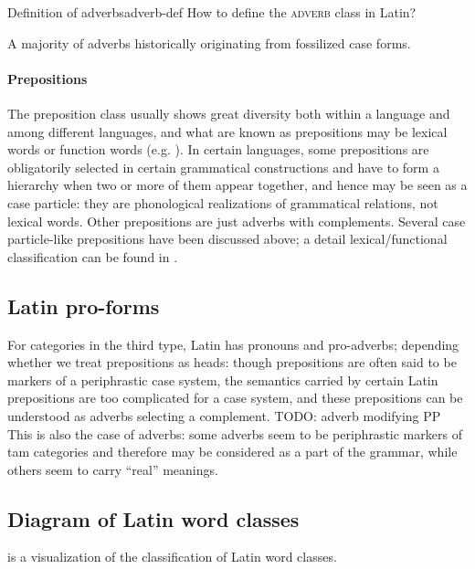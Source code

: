 \documentclass[a4paper, oneside, 12pt]{report}
\newcommand*{\category}[1]{\textsc{#1}}
\begin{document}
\begin{todobox}{Definition of adverbs}{adverb-def}
    How to define the \category{adverb} class in Latin?
\end{todobox}

A majority of adverbs historically originating from fossilized case forms.

\paragraph*{Prepositions}
\label{sec:grammatical.pos.preposition}

The preposition class usually shows great diversity  
both within a language and among different languages,
and what are known as prepositions may be lexical words or function words 
(e.g. \citealt{garzonio2021functional}).
In certain languages, some prepositions are obligatorily selected in certain grammatical constructions
and have to form a hierarchy when two or more of them appear together,
and hence may be seen as a case particle:
they are phonological realizations of grammatical relations, not lexical words.
Other prepositions are just adverbs with complements.
Several case particle-like prepositions have been discussed above;
a detail lexical/functional classification can be found in 
.

\subsection{Latin pro-forms}

For categories in the third type,
Latin has pronouns and pro-adverbs; 
depending whether we treat prepositions as heads:
though prepositions are often said to be markers of a periphrastic case system,
the semantics carried by certain Latin prepositions are too complicated for a case system,
and these prepositions can be understood as adverbs selecting a complement.
TODO: adverb modifying PP  
This is also the case of adverbs:
some adverbs seem to be periphrastic markers of \acs{tam} categories
and therefore may be considered as a part of the grammar,
while others seem to carry ``real'' meanings.

\subsection{Diagram of Latin word classes} 
 is a visualization of the classification of Latin word classes.
\end{document}
